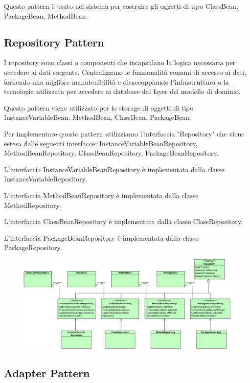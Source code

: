 \documentclass[11pt]{article}
\begin{document}
	Questo pattern è usato nel sistema per costruire gli oggetti di tipo ClassBean, PackageBean, MethodBean.
	\newpage
	\subsection{Repository Pattern}
	
	I repository sono classi o componenti che incapsulano la logica necessaria per accedere ai dati sorgente. Centralizzano le funzionalità comuni di accesso ai dati,
	fornendo una migliore manutenibilità e disaccoppiando l'infrastruttura o la tecnologia utilizzata per accedere ai database dal layer del modello di dominio.
	
	Questo pattern viene utilizzato per lo storage di oggetti di tipo InstanceVariableBean, MethodBean, ClassBean, PackageBean.	
	
	Per implementare questo pattern utilizziamo l'interfaccia "Repository" che viene estesa dalle
	seguenti interfacce: InstanceVariableBeanRepository, MethodBeanRepository, ClassBeanRepository, PackageBeanRepository.
	
	L'interfaccia InstanceVariableBeanRepository è implementata dalla classe InstanceVariableRepository.
	
	L'interfaccia MethodBeanRepository è implementata dalla classe MethodRepository.
	
	L'interfaccia ClassBeanRepository è implementata dalla classe ClassRepository.
	
	L'interfaccia PackageBeanRepository	è implementata dalla classe PackageRepository.
	
\begin{figure}[!h]
		\includegraphics[width=16.5cm]{diagrams/RepositoryPattern}
	\end{figure}

\subsection{Adapter Pattern}
\end{document}
